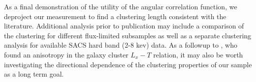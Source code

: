 \documentclass[preprint]{aastex63}
\begin{document}
As a final demonstration of the utility of the angular correlation function, we deproject our measurement to find a clustering length consistent with the literature.
Additional analysis prior to publication may include a comparison of the clustering 
for different flux-limited subsamples as well as a separate clustering analysis for available SACS hard band (2-8 kev) data. As a followup to 
\citet{migkas}, who found an anisotropy in the galaxy cluster $L_x - T$ relation, it may also be worth investigating the directional dependence of 
the clustering properties of our sample as a long term goal.





\end{document}
